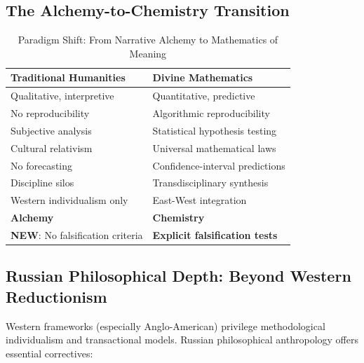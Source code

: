 \documentclass[11pt,a4paper]{article}
\theoremstyle{definition}
\theoremstyle{remark}
\begin{document}

\subsection{The Alchemy-to-Chemistry Transition}


\begin{table}[H]
\centering
\begin{tabular}{|p{5cm}|p{5.5cm}|}
\hline
\textbf{Traditional Humanities} & \textbf{Divine Mathematics} \\
\hline
Qualitative, interpretive & Quantitative, predictive \\
\hline
No reproducibility & Algorithmic reproducibility \\
\hline
Subjective analysis & Statistical hypothesis testing \\
\hline
Cultural relativism & Universal mathematical laws \\
\hline
No forecasting & Confidence-interval predictions \\
\hline
Discipline silos & Transdisciplinary synthesis \\
\hline
Western individualism only & East-West integration \\
\hline
\textbf{Alchemy} & \textbf{Chemistry} \\
\hline
\rowcolor{green!10}
\textbf{NEW}: No falsification criteria & \textbf{Explicit falsification tests} \\
\hline
\end{tabular}
\caption{Paradigm Shift: From Narrative Alchemy to Mathematics of Meaning}
\end{table}

\subsection{Russian Philosophical Depth: Beyond Western Reductionism}

Western frameworks (especially Anglo-American) privilege methodological individualism and transactional models. Russian philosophical anthropology offers essential correctives:
\end{document}
